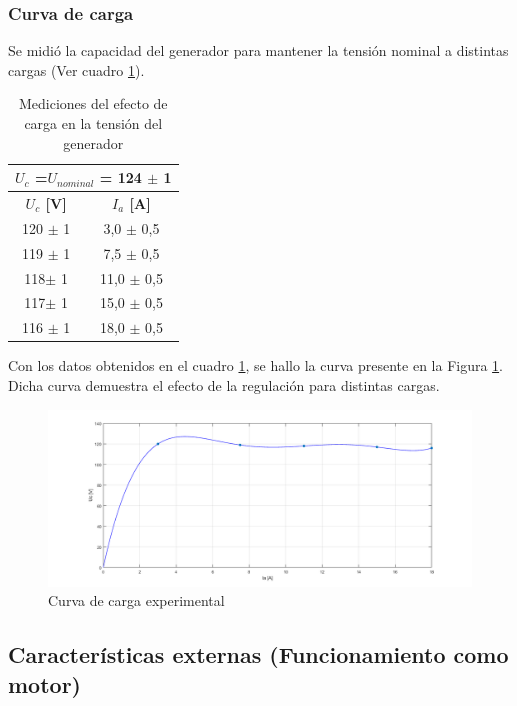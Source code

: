 \documentclass[11pt,letterpaper]{article}     %
\begin{document}
\subsubsection{Curva de carga}
Se midió la capacidad del generador para mantener la tensión nominal a distintas cargas (Ver cuadro \ref{MedCurvaCarga}). 
\begin{table}[H]
	\centering
	\caption{Mediciones del efecto de carga en la tensión del generador}
	\label{MedCurvaCarga}
	\begin{tabular}{|c|c|}
		\hline
		\multicolumn{2}{|c|}{\textbf{$U_{c}$ =$U_{nominal}$ = 124 $\pm$ 1}} \\ \hline
		\textbf{$U_{c}$ {[}V{]}}         & \textbf{$I_{a}$ {[}A{]}}         \\ \hline
		120 $\pm$ 1                      & 3,0 $\pm$ 0,5                    \\ \hline
		119 $\pm$ 1                      & 7,5 $\pm$ 0,5                    \\ \hline
		118$\pm$ 1                       & 11,0 $\pm$ 0,5                   \\ \hline
		117$\pm$ 1                       & 15,0 $\pm$ 0,5                   \\ \hline
		116 $\pm$ 1                      & 18,0 $\pm$ 0,5                   \\ \hline
	\end{tabular}
\end{table}
Con los datos obtenidos en el cuadro \ref{MedCurvaCarga}, se hallo la curva presente en la Figura \ref{fig:CurvaDeCarga}. Dicha curva demuestra el efecto de la regulación para distintas cargas.
\begin{figure}[H]
	\centering
	\includegraphics[scale=0.5]{./recursos-Lab6/CurvaDeCarga.png}
	\caption{Curva de carga experimental}
	\label{fig:CurvaDeCarga}
\end{figure}
\subsection{Características externas (Funcionamiento como motor)}
\end{document}
